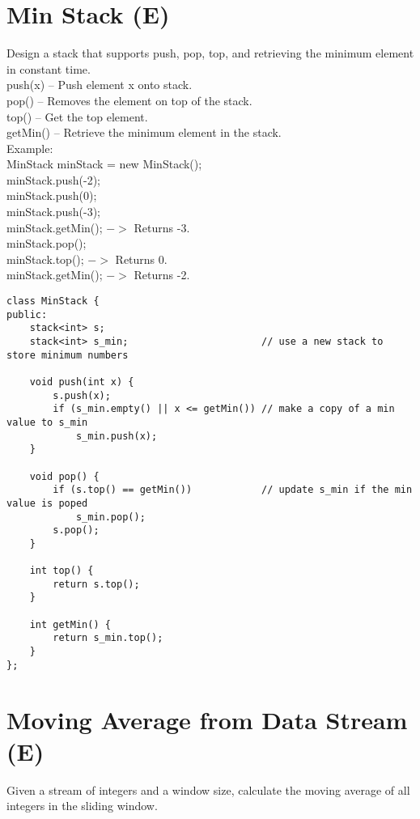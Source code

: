 \section{Min Stack (E)}
 Design a stack that supports push, pop, top, and retrieving the minimum element in constant time.\\

    push(x) -- Push element x onto stack.\\
    pop() -- Removes the element on top of the stack.\\
    top() -- Get the top element.\\
    getMin() -- Retrieve the minimum element in the stack.\\
    
Example:\\
MinStack minStack = new MinStack();\\
minStack.push(-2);\\
minStack.push(0);\\
minStack.push(-3);\\
minStack.getMin();   $->$ Returns -3.\\
minStack.pop();\\
minStack.top();      $->$ Returns 0.\\
minStack.getMin();   $->$ Returns -2.\\

\begin{lstlisting}
class MinStack {
public:
    stack<int> s;
    stack<int> s_min;                       // use a new stack to store minimum numbers
    
    void push(int x) {
        s.push(x);
        if (s_min.empty() || x <= getMin()) // make a copy of a min value to s_min
            s_min.push(x);
    }
    
    void pop() {
        if (s.top() == getMin())            // update s_min if the min value is poped
            s_min.pop();
        s.pop();
    }
    
    int top() {
        return s.top();
    }
    
    int getMin() {
        return s_min.top();
    }
};
\end{lstlisting}


\section{Moving Average from Data Stream (E)}
Given a stream of integers and a window size, calculate the moving average of all integers in the sliding window.\\


